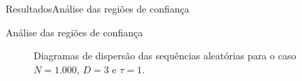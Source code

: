 \documentclass[10pt,xcolor={dvipsnames}]{beamer}
\begin{document}
\begin{frame}{Resultados}{Análise das regiões de confiança}
\begin{block}{Análise das regiões de confiança}
	\begin{figure}
		\centering
		\caption{Diagramas de dispersão das sequências aleatórias para o caso $N=1.000$, $D=3$ e $\tau=1$.}\label{Fig:AleattD3tau1}
	\end{figure}	
\end{block}
\end{frame}
\end{document}
